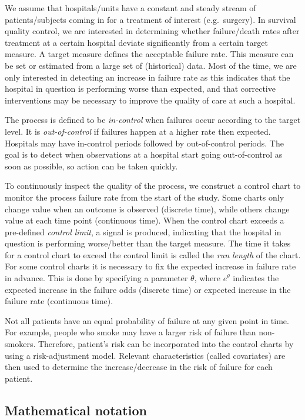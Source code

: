 We assume that hospitals/units have a constant and steady stream of patients/subjects coming in for a treatment of interest (e.g.~surgery). In survival quality control, we are interested in determining whether failure/death rates after treatment at a certain hospital deviate significantly from a certain target measure. A target measure defines the acceptable failure rate. This measure can be set or estimated from a large set of (historical) data. Most of the time, we are only interested in detecting an increase in failure rate as this indicates that the hospital in question is performing worse than expected, and that corrective interventions may be necessary to improve the quality of care at such a hospital.

The process is defined to be \emph{in-control} when failures occur according to the target level. It is \emph{out-of-control} if failures happen at a higher rate then expected. Hospitals may have in-control periods followed by out-of-control periods. The goal is to detect when observations at a hospital start going out-of-control as soon as possible, so action can be taken quickly.

To continuously inspect the quality of the process, we construct a control chart to monitor the process failure rate from the start of the study. Some charts only change value when an outcome is observed (discrete time), while others change value at each time point (continuous time). When the control chart exceeds a pre-defined \emph{control limit}, a signal is produced, indicating that the hospital in question is performing worse/better than the target measure. The time it takes for a control chart to exceed the control limit is called the \emph{run length} of the chart. For some control charts it is necessary to fix the expected increase in failure rate in advance. This is done by specifying a parameter \(\theta\), where \(e^\theta\) indicates the expected increase in the failure odds (discrete time) or expected increase in the failure rate (continuous time).

Not all patients have an equal probability of failure at any given point in time. For example, people who smoke may have a larger risk of failure than non-smokers. Therefore, patient's risk can be incorporated into the control charts by using a risk-adjustment model. Relevant characteristics (called covariates) are then used to determine the increase/decrease in the risk of failure for each patient.

\hypertarget{sec:MathematicalNotation}{%
\subsection{Mathematical notation}\label{sec:MathematicalNotation}}

